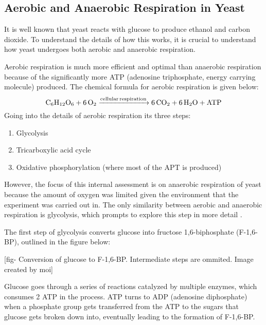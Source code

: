 \documentclass[12pt]{article}
\begin{document}
\subsection{Aerobic and Anaerobic Respiration in Yeast}
It is well known that yeast reacts with glucose to produce ethanol and carbon dioxide. To understand the details of how this works, it is crucial to understand how yeast undergoes both aerobic and anaerobic respiration.

\medskip

Aerobic respiration is much more efficient and optimal than anaerobic respiration because of the significantly more ATP (adenosine triphosphate, energy carrying molecule) produced. The chemical formula for aerobic respiration is given below:
\begin{equation}
    \ce{C6H12O6 + 6O2 ->[cellular respiration] 6CO2 + 6H2O + ATP}
\end{equation}
Going into the details of aerobic respiration its three steps:
\begin{enumerate}[topsep=\parskip, noitemsep]
    \item Glycolysis
    \item Tricarboxylic acid cycle
    \item Oxidative phosphorylation (where most of the APT is produced)
\end{enumerate}


\medskip

However, the focus of this internal assessment is on anaerobic respiration of yeast because the amount of oxygen was limited given the environment that the experiment was carried out in. The only similarity between aerobic and anaerobic respiration is glycolysis, which prompts to explore this step in more detail \parencite{ref}.

\medskip

The first step of glycolysis converts glucose into fructose 1,6-biphosphate (F-1,6-BP), outlined in the figure below:

\medskip

[fig- Conversion of glucose to F-1,6-BP. Intermediate steps are ommited. Image created by moi]

\medskip

Glucose goes through a series of reactions catalyzed by multiple enzymes, which consumes 2 ATP in the process. ATP turns to ADP (adenosine diphosphate) when a phosphate group gets transferred from the ATP to the sugars that glucose gets broken down into, eventually leading to the formation of F-1,6-BP.
\end{document}
